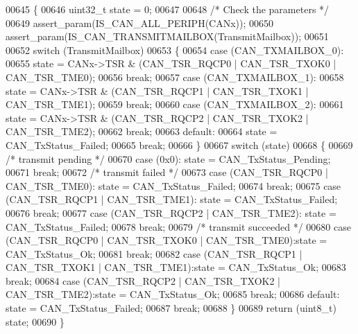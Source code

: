 \begin{DoxyCode}
00645 \{
00646   uint32\_t state = 0;
00647 
00648   \textcolor{comment}{/* Check the parameters */}
00649   assert_param(IS_CAN_ALL_PERIPH(CANx));
00650   assert_param(IS_CAN_TRANSMITMAILBOX(TransmitMailbox));
00651  
00652   \textcolor{keywordflow}{switch} (TransmitMailbox)
00653   \{
00654     \textcolor{keywordflow}{case} (CAN_TXMAILBOX_0): 
00655       state =   CANx->TSR &  (CAN_TSR_RQCP0 | CAN_TSR_TXOK0 | CAN_TSR_TME0);
00656       \textcolor{keywordflow}{break};
00657     \textcolor{keywordflow}{case} (CAN_TXMAILBOX_1): 
00658       state =   CANx->TSR &  (CAN_TSR_RQCP1 | CAN_TSR_TXOK1 | CAN_TSR_TME1);
00659       \textcolor{keywordflow}{break};
00660     \textcolor{keywordflow}{case} (CAN_TXMAILBOX_2): 
00661       state =   CANx->TSR &  (CAN_TSR_RQCP2 | CAN_TSR_TXOK2 | CAN_TSR_TME2);
00662       \textcolor{keywordflow}{break};
00663     \textcolor{keywordflow}{default}:
00664       state = CAN_TxStatus_Failed;
00665       \textcolor{keywordflow}{break};
00666   \}
00667   \textcolor{keywordflow}{switch} (state)
00668   \{
00669       \textcolor{comment}{/* transmit pending  */}
00670     \textcolor{keywordflow}{case} (0x0): state = CAN_TxStatus_Pending;
00671       \textcolor{keywordflow}{break};
00672       \textcolor{comment}{/* transmit failed  */}
00673      \textcolor{keywordflow}{case} (CAN_TSR_RQCP0 | CAN_TSR_TME0): state = CAN_TxStatus_Failed;
00674       \textcolor{keywordflow}{break};
00675      \textcolor{keywordflow}{case} (CAN_TSR_RQCP1 | CAN_TSR_TME1): state = CAN_TxStatus_Failed;
00676       \textcolor{keywordflow}{break};
00677      \textcolor{keywordflow}{case} (CAN_TSR_RQCP2 | CAN_TSR_TME2): state = CAN_TxStatus_Failed;
00678       \textcolor{keywordflow}{break};
00679       \textcolor{comment}{/* transmit succeeded  */}
00680     \textcolor{keywordflow}{case} (CAN_TSR_RQCP0 | CAN_TSR_TXOK0 | CAN_TSR_TME0):state = CAN_TxStatus_Ok;
00681       \textcolor{keywordflow}{break};
00682     \textcolor{keywordflow}{case} (CAN_TSR_RQCP1 | CAN_TSR_TXOK1 | CAN_TSR_TME1):state = CAN_TxStatus_Ok;
00683       \textcolor{keywordflow}{break};
00684     \textcolor{keywordflow}{case} (CAN_TSR_RQCP2 | CAN_TSR_TXOK2 | CAN_TSR_TME2):state = CAN_TxStatus_Ok;
00685       \textcolor{keywordflow}{break};
00686     \textcolor{keywordflow}{default}: state = CAN_TxStatus_Failed;
00687       \textcolor{keywordflow}{break};
00688   \}
00689   \textcolor{keywordflow}{return} (uint8\_t) state;
00690 \}
\end{DoxyCode}
